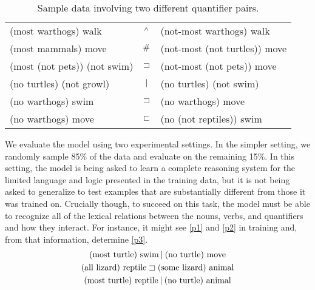 

\begin{table}[htp]
  \centering
  \begin{tabular}{l c l}
    \toprule
    (most warthogs) walk         & $\mathbin{^{\wedge}}$ & (not-most warthogs) walk\\
    (most mammals) move          & $\mathbin{\#}$ &  (not-most (not turtles)) move\\
    (most (not pets)) (not swim) & $\sqsupset$ & (not-most (not pets)) move 
    \\[2ex]    
    (no turtles) (not growl)     & $\mathbin{|}$ & (no turtles) (not swim)\\
    (no warthogs) swim           & $\sqsupset$ & (no warthogs) move\\
    (no warthogs) move           & $\sqsubset$ & (no (not reptiles)) swim\\
    \bottomrule
  \end{tabular}
  \caption{Sample data involving two different quantifier pairs.}
  \label{examplesofdata}
\end{table}

We evaluate the model using two experimental settings. In the simpler
setting, we randomly sample 85\% of the data and evaluate on the
remaining 15\%. In this setting, the model is being asked to learn a
complete reasoning system for the limited language and logic presented
in the training data, but it is not being asked to generalize to test
examples that are substantially different from those it was trained
on. Crucially though, to succeed on this task, the model must be able
to recognize all of the lexical relations between the nouns, verbs,
and quantifiers and how they interact. For instance, it might see
\eqref{p1} and \eqref{p2} in training and, from that information,
determine \eqref{p3}.
%
\begin{gather}
  \text{(most turtle) swim} \mathbin{|} \text{(no turtle) move}\label{p1}
  \\
  \text{(all lizard) reptile} \sqsupset  \text{(some lizard) animal}\label{p2}
  \\
  \text{(most turtle) reptile} \mathbin{|} \text{(no turtle) animal}\label{p3}
\end{gather}

